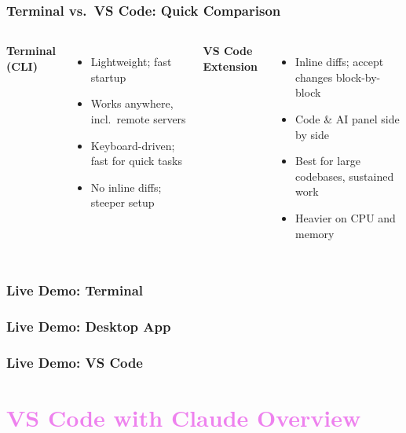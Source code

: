 \documentclass[aspectratio=169, 12pt]{beamer}
\begin{document}
\begin{frame}
\frametitle{Terminal vs.\ VS Code: Quick Comparison}

\begin{columns}[t]
\textbf{Terminal (CLI)}
\vspace{.05in}
\begin{itemize}
    \item Lightweight; fast startup
    \item Works anywhere, incl.\ remote servers
    \item Keyboard-driven; fast for quick tasks
    \item No inline diffs; steeper setup
\end{itemize}

\textbf{VS Code Extension}
\vspace{.05in}
\begin{itemize}
    \item Inline diffs; accept changes block-by-block
    \item Code \& AI panel side by side
    \item Best for large codebases, sustained work
    \item Heavier on CPU and memory
\end{itemize}
\end{columns}

\end{frame}


\begin{frame}
\frametitle{Live Demo: Terminal}

\end{frame}



\begin{frame}
\frametitle{Live Demo: Desktop App}

\end{frame}


\begin{frame}
\frametitle{Live Demo: VS Code}

\end{frame}





\section{\textcolor{violet}{VS Code with Claude Overview \vspace{0.3in}}}
\end{document}
